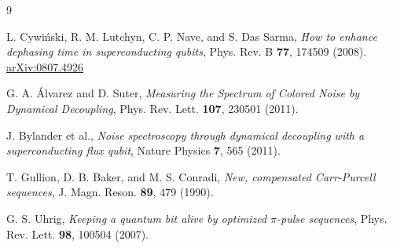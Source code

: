 \documentclass[12pt]{article}
\begin{document}
\begin{thebibliography}{9}

L. Cywi\'{n}ski, R. M. Lutchyn, C. P. Nave, and S. Das Sarma,
\textit{How to enhance dephasing time in superconducting qubits},
Phys. Rev. B \textbf{77}, 174509 (2008).
\href{https://arxiv.org/abs/0807.4926}{arXiv:0807.4926}

G. A. \'{A}lvarez and D. Suter,
\textit{Measuring the Spectrum of Colored Noise by Dynamical Decoupling},
Phys. Rev. Lett. \textbf{107}, 230501 (2011).

J. Bylander et al.,
\textit{Noise spectroscopy through dynamical decoupling with a superconducting flux qubit},
Nature Physics \textbf{7}, 565 (2011).

T. Gullion, D. B. Baker, and M. S. Conradi,
\textit{New, compensated Carr-Purcell sequences},
J. Magn. Reson. \textbf{89}, 479 (1990).

G. S. Uhrig,
\textit{Keeping a quantum bit alive by optimized $\pi$-pulse sequences},
Phys. Rev. Lett. \textbf{98}, 100504 (2007).

\end{thebibliography}
\end{document}
